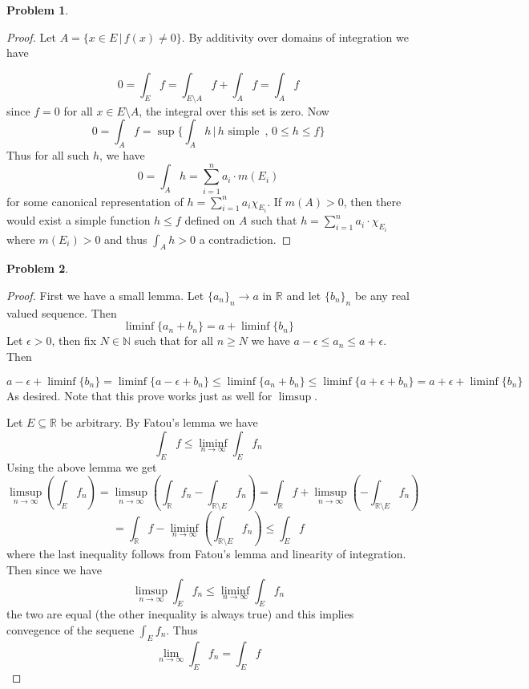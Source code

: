 \documentclass{article}
\newcommand{\R}{\mathbb{R}}
\newcommand{\N}{\mathbb{N}}
\newtheorem{prb}{Problem}
\begin{document}
	    \begin{prb}  \end{prb} 
	    \begin{proof} 
		    Let $A = \{ x \in E\, | \, f(x) \neq 0 \}$. By additivity over domains of integration we have 

		    \[  0 = \int_E f = \int_{E \setminus A } f + \int_A f = \int_A f \] 
		    since $f = 0$ for all $x \in E \setminus A$, the integral over this set is zero. 
		    Now 
		    \[ 0 = \int_A f = \sup\{ \int_A h \, |\, h \text{ simple } \, , \, 0 \leq h \leq f \} \] 
		    Thus for all such $h$, we have 
		    \[ 0 = \int_A h = \sum_{i = 1}^n a_i \cdot m(E_i) \]
		    for some canonical representation of $h = \sum_{i = 1}^n a_i \chi_{E_i}$. If $m(A) > 0$, 
		    then there would exist a simple function $h 
		    \leq f$ defined on $A$ such that 
		    $h = \sum_{i = 1}^n a_i \cdot \chi_{E_i}$ where $m(E_i) > 0$ and thus $\int_A h> 0$ a contradiction. 
	    \end{proof} 

	    \begin{prb}  \end{prb} 
	    \begin{proof} 
	      First we have a small lemma. Let $\{a_n\}_n \to a$ in $\R$ and let $\{b_n\}_n$ be any real valued sequence. 	Then 
	      \[ \liminf \{ a_n + b_n \} = a + \liminf\{b_n\} \] 
	      Let $\epsilon > 0$, then fix $N \in \N$ such that for all $n \geq N$ we have $a - \epsilon \leq a_n \leq a + \epsilon$. Then 

	      \[ a - \epsilon + \liminf\{b_n\} =  \liminf\{a - \epsilon + b_n\} \leq \liminf\{ a_n + b_n\} \leq \liminf\{ a + \epsilon + b_n \} = a + \epsilon + \liminf\{b_n\} \]
As desired. Note that this prove works just as well for $\limsup$. 
	       
\medskip 

Let $E \subseteq \R$ be arbitrary. By Fatou's lemma we have 
\[\int_E f \leq \liminf_{n \to \infty} \int_E f_n \] 
Using the above lemma we get 
\[ \limsup_{n \to \infty} \left( \int_E f_n \right) = \limsup_{n \to \infty } \left( \int_\R f_n - \int_{\R \setminus E}f_n \right) = 
\int_\R f + \limsup_{n \to \infty} \left( - \int_{\R \setminus E} f_n \right)\] 
\[ = \int_\R f - \liminf_{n \to \infty } \left( \int_{\R \setminus E} f_n \right) \leq \int_E f \] 
where the last inequality follows from Fatou's lemma and linearity of integration.  
Then since we have 
\[ \limsup_{n \to \infty} \int_E f_n \leq \liminf_{n \to \infty} \int_E f_n  \] 
the two are equal (the other inequality is always true) and this implies convegence of the sequene $\int_E f_n$. 
Thus 
\[ \lim_{n \to \infty } \int_E f_n = \int_E f \] 

	    \end{proof} 
\end{document}

